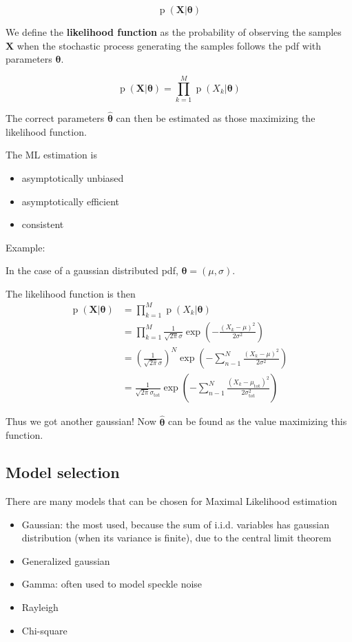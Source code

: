 \documentclass[oneside,onecolumn]{report}
\DeclareMathOperator*{\pdf}{p}
\begin{document}
$$ \pdf(\bm X | \bm \theta) $$

We define the \textbf{likelihood function} as the probability of observing the samples $\bm X$ when the stochastic process generating the samples follows the pdf with parameters $\bm \theta$.

$$ \pdf(\bm X | \bm \theta) = \prod_{k = 1}^M \pdf(X_k | \bm \theta) $$

The correct parameters $\bm{\widehat \theta}$ can then be estimated as those maximizing the likelihood function.

The ML estimation is
\begin{itemize}
    \item asymptotically unbiased
    \item asymptotically efficient
    \item consistent
\end{itemize}


Example:

In the case of a gaussian distributed pdf, $\bm \theta = (\mu, \sigma)$.

The likelihood function is then
\begin{align*}
    \pdf(\bm X| \bm \theta)
    &= \prod_{k = 1}^M \pdf(X_k | \bm \theta) \\
    &= \prod_{k = 1}^M \frac{1}{\sqrt{2 \pi} \sigma} \exp( -\frac{(X_k - \mu)^2}{2 \sigma^2}) \\
    &= \left(\frac{1}{\sqrt{2 \pi} \sigma}\right)^N \exp( - \sum_{n -1}^N \frac{(X_k - \mu)^2}{2 \sigma^2}) \\
    &=  \frac{1}{\sqrt{2 \pi} \sigma_\text{tot}} \exp( - \sum_{n -1}^N \frac{(X_k - \mu_\text{tot})^2}{2 \sigma_\text {tot}^2} )
\end{align*}

Thus we got another gaussian! Now $\bm{\widehat \theta}$ can be found as the value maximizing this function.

\subsection{Model selection}

There are many models that can be chosen for Maximal Likelihood estimation
\begin{itemize}
    \item Gaussian: the most used, because the sum of i.i.d. variables has gaussian distribution (when its variance is finite), due to the central limit theorem
    \item Generalized gaussian
    \item Gamma: often used to model speckle noise
    \item Rayleigh
    \item Chi-square
\end{itemize}
\end{document}
